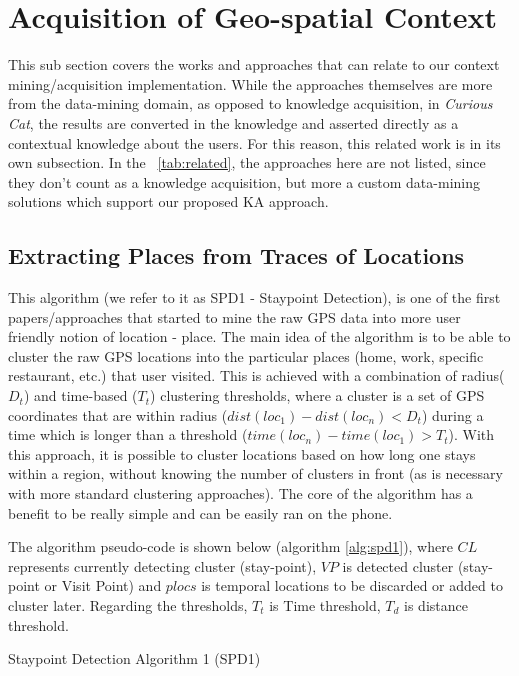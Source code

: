 \section{Acquisition of Geo-spatial Context}
This sub section covers the works and approaches that can relate to our 
context mining/acquisition implementation. While the approaches themselves are
more from the data-mining domain, as opposed to knowledge acquisition, in
\emph{Curious Cat}, the results are converted in the knowledge and asserted 
directly as a contextual knowledge about the users. For this reason, this
related work is in its own subsection. In the \tablename~\ref{tab:related}, the 
approaches here are not listed, since they don't count as a knowledge
acquisition, but more a custom data-mining solutions which support our
proposed KA approach.

\subsection{Extracting Places from Traces of Locations}
\label{section:SPD1}
This algorithm (we refer to it as SPD1 - Staypoint Detection), is one of the 
first papers/approaches that started to mine the raw GPS data
into more user friendly notion of location - place.\parencite{Kang2005} The main
idea of the algorithm is to be able to cluster the raw GPS locations into the
particular places (home, work, specific restaurant, etc.) that user visited. 
This is achieved with a combination of radius($D_t$) and time-based ($T_t$) 
clustering thresholds, where a cluster is a set of GPS coordinates that are 
within radius ($dist(loc_1) - dist(loc_n) < D_t$) during a time which is longer 
than a threshold ($time(loc_n)-time(loc_1) > T_t$). With this approach, it is
possible to cluster locations based on how long one stays within a region, 
without knowing the number of clusters in front (as is necessary with more
standard clustering approaches). The core of the algorithm has a benefit
to be really simple and can be easily ran on the phone.

The algorithm pseudo-code is shown below (algorithm \ref{alg:spd1}), where $CL$ 
represents currently 
detecting cluster (stay-point), $VP$ is detected cluster (stay-point or Visit 
Point) and $plocs$ is temporal locations to be discarded or added to cluster
later. Regarding the thresholds, $T_t$ is Time threshold, $T_d$ is distance 
threshold.

\begin{algorithm}[htb]
\caption{Staypoint Detection Algorithm 1 (SPD1)}
\label{alg:spd1}

\vspace{5pt}
\vspace{5pt}
{
}
\end{algorithm}


